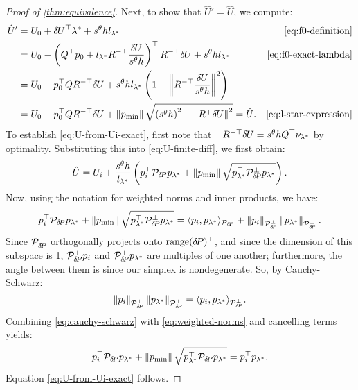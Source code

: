 \documentclass[sisc-eikonal.tex]{subfiles}
\begin{document}
\begin{proof}[Proof of \cref{thm:equivalence}]
  Next, to show that $\hat{U}' = \hat{U}$, we compute:
  \begin{align*}
    \hat{U}'
    &= U_0 + \delU^\top \lambda^* + s^\theta h l_{\lambda^*} & \cref{eq:f0-definition} \\
    &= U_0 - \parens{Q^\top p_0 + l_{\lambda^*} R^{-\top} \frac{\delU}{s^\theta h}}^\top R^{-\top} \delU + s^\theta h l_{\lambda^*} & \cref{eq:f0-exact-lambda} \\
    &= U_0 - p_0^\top Q R^{-\top} \delU + s^\theta h l_{\lambda^*} \parens{1 - \norm{R^{-\top} \frac{\delU}{s^\theta h}}^2} \\
    &= U_0 - p_0^\top Q R^{-\top} \delU + \norm{\pmin} \sqrt{\parens{s^\theta h}^2 - \norm{R^\top \delU}^2} = \hat{U}. & \cref{eq:l-star-expression}
  \end{align*}
  To establish \cref{eq:U-from-Ui-exact}, first note that
  $-R^{-\top} {\delta \hspace{-0.09em} U} = s^\theta h Q^\top \nu_{\lambda^*}$ by
  optimality. Substituting this into \cref{eq:U-finite-diff}, we first
  obtain:
  \begin{equation}
    \hat{U} = U_i + \frac{s^\theta h}{l_{\lambda^*}} \left(p_i^\top \mathcal{P}_{{\delta \hspace{-0.14em} P}} p_{\lambda^*} + \left\|p_{\operatorname{min}}\right\| \sqrt{p_{\lambda^*}^\top \mathcal{P}^\perp_{{\delta \hspace{-0.14em} P}} p_{\lambda^*}}\right).
  \end{equation}
  Now, using the notation for weighted norms and inner products, we have:
  \begin{equation}\label{eq:weighted-norms}
    p_i^\top \mathcal{P}_{\delP} p_{\lambda^*} + \norm{\pmin} \sqrt{p_{\lambda^*}^\top \mathcal{P}^\perp_{\delP} p_{\lambda^*}} = \langle p_i, p_{\lambda^*} \rangle_{\mathcal{P}_{\delP}} + \norm{p_i}_{\mathcal{P}^\perp_{\delP}} \norm{p_{\lambda^*}}_{\mathcal{P}^\perp_{\delP}}.
  \end{equation}
  Since $\mathcal{P}^\perp_{{\delta \hspace{-0.14em} P}}$ orthogonally projects onto
  $\operatorname{range}({\delta \hspace{-0.14em} P})^\perp$, and since the dimension of this subspace
  is 1, $\mathcal{P}^\perp_{{\delta \hspace{-0.14em} P}} p_i$ and
  $\mathcal{P}^\perp_{{\delta \hspace{-0.14em} P}} p_{\lambda^*}$ are multiples of one
  another; furthermore, the angle between them is since our simplex is
  nondegenerate. So, by Cauchy-Schwarz:
  \begin{equation}\label{eq:cauchy-schwarz}
    \norm{p_i}_{\mathcal{P}^\perp_{\delP}} \norm{p_{\lambda^*}}_{\mathcal{P}^\perp_{\delP}} = \langle p_i, p_{\lambda^*} \rangle_{\mathcal{P}^\perp_{\delP}}.
  \end{equation}
  Combining \cref{eq:cauchy-schwarz} with \cref{eq:weighted-norms} and
  cancelling terms yields:
  \begin{equation}
    p_i^\top \mathcal{P}_{{\delta \hspace{-0.14em} P}} p_{\lambda^*} + \left\|p_{\operatorname{min}}\right\| \sqrt{p_{\lambda^*}^\top \mathcal{P}_{{\delta \hspace{-0.14em} P}} p_{\lambda^*}} = p_i^\top p_{\lambda^*}.
  \end{equation}
  Equation \cref{eq:U-from-Ui-exact} follows.


\end{proof}
\end{document}
